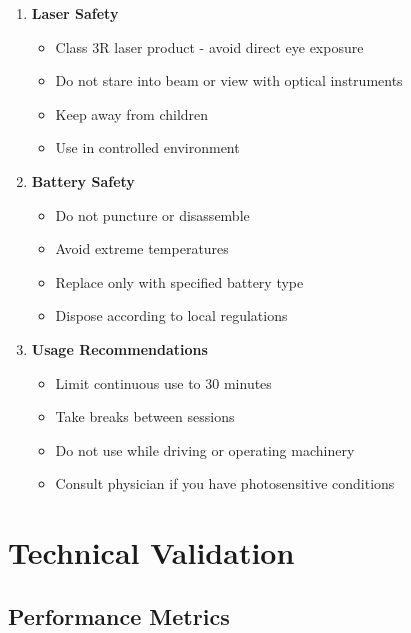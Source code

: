 \documentclass[12pt,a4paper]{article}
\begin{document}
\begin{enumerate}
\item \textbf{Laser Safety}
    \begin{itemize}
    \item Class 3R laser product - avoid direct eye exposure
    \item Do not stare into beam or view with optical instruments
    \item Keep away from children
    \item Use in controlled environment
    \end{itemize}

\item \textbf{Battery Safety}
    \begin{itemize}
    \item Do not puncture or disassemble
    \item Avoid extreme temperatures
    \item Replace only with specified battery type
    \item Dispose according to local regulations
    \end{itemize}

\item \textbf{Usage Recommendations}
    \begin{itemize}
    \item Limit continuous use to 30 minutes
    \item Take breaks between sessions
    \item Do not use while driving or operating machinery
    \item Consult physician if you have photosensitive conditions
    \end{itemize}
\end{enumerate}

\section{Technical Validation}

\subsection{Performance Metrics}
\end{document}
